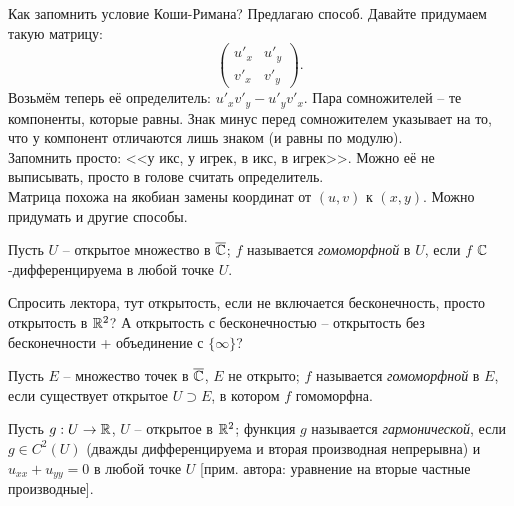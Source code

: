 \begin{anote}
	Как запомнить условие Коши-Римана? Предлагаю способ. Давайте придумаем такую матрицу:
	\[
		\begin{pmatrix}
			{u'}_x & {u'}_y \\
			{v'}_x & {v'}_y
		\end{pmatrix}.
	\]
	Возьмём теперь её определитель: ${u'}_x {v'}_y - {u'}_y {v'}_x$. Пара сомножителей -- те компоненты, которые равны. Знак минус перед сомножителем указывает на то, что у компонент отличаются лишь знаком (и равны по модулю). \\
	Запомнить просто: <<у икс, у игрек, в икс, в игрек>>. Можно её не выписывать, просто в голове считать определитель. \\
	Матрица похожа на якобиан замены координат от $(u, v)$ к $(x, y)$. Можно придумать и другие способы.
\end{anote}

\begin{definition}
	Пусть $U$ -- открытое множество в $\overline{\mathbb{C}}$; $f$ называется \emph{гомоморфной} в $U$, если $f$ $\mathbb{C}$-дифференцируема в любой точке $U$. 
\end{definition}

{\color{red} Спросить лектора, тут открытость, если не включается бесконечность, просто открытость в $\mathbb{R}^2$? А открытость с бесконечностью -- открытость без бесконечности + объединение с $\{ \infty \}$?}

\begin{definition}
	Пусть $E$ -- множество точек в $\overline{\mathbb{C}}$, $E$ не открыто; $f$ называется \emph{гомоморфной} в $E$, если существует открытое $U \supset E$, в котором $f$ гомоморфна.
\end{definition}

\begin{definition}
	Пусть $g: U \to \mathbb{R}$, $U$ -- открытое в $\mathbb{R}^2$; функция $g$ называется \emph{гармонической}, если $g \in C^2(U)$ (дважды дифференцируема и вторая производная непрерывна) и $u_{xx} + u_{yy} = 0$ в любой точке $U$ [прим. автора: уравнение на вторые частные производные].
\end{definition}


